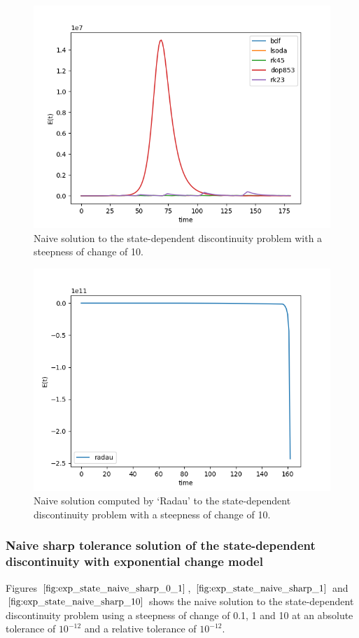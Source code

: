 \begin{figure}[H]
\centering
\includegraphics[width=0.7\linewidth]{./figures/exp_state_naive_10}
\caption{Naive solution to the state-dependent discontinuity problem with a steepness of change of 10.}
\label{fig:exp_state_naive_10}
\end{figure}

\begin{figure}[H]
\centering
\includegraphics[width=0.7\linewidth]{./figures/exp_state_naive_radau_10}
\caption{Naive solution computed by `Radau' to the state-dependent discontinuity problem with a steepness of change of 10.}
\label{fig:exp_state_naive_radau_10}
\end{figure}

\subsubsection{Naive sharp tolerance solution of the state-dependent discontinuity with exponential change model}

Figures $\ref{fig:exp_state_naive_sharp_0_1}$, $\ref{fig:exp_state_naive_sharp_1}$ and $\ref{fig:exp_state_naive_sharp_10}$ shows the naive solution to the state-dependent discontinuity problem using a steepness of change of 0.1, 1 and 10 at an absolute tolerance of $10^{-12}$ and a relative tolerance of $10^{-12}$.

